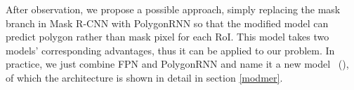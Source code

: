 After observation, we propose a possible approach, simply replacing the mask branch in Mask R-CNN with PolygonRNN so that the modified model can predict polygon rather than mask pixel for each RoI. This model takes two models' corresponding advantages, thus it can be applied to our problem. In practice, we just combine FPN and PolygonRNN and name it a new model \modelnameshort\ (\modelnamelong), of which the architecture is shown in detail in section \ref{modmer}.
